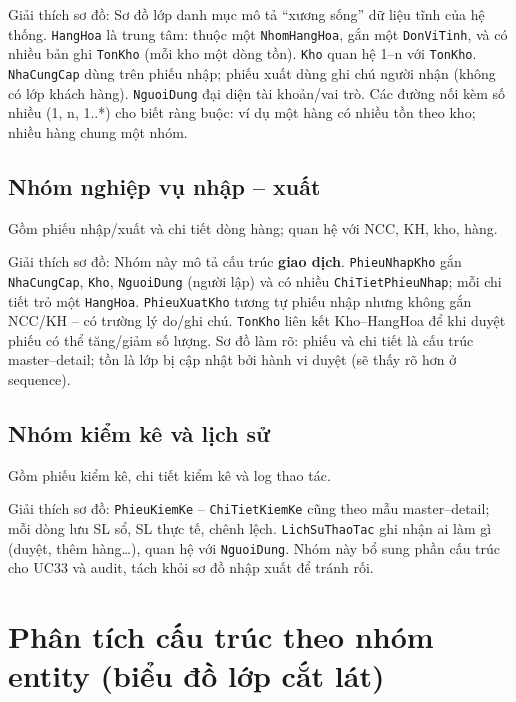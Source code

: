 Giải thích sơ đồ: Sơ đồ lớp danh mục mô tả ``xương sống'' dữ liệu tĩnh của hệ thống. \texttt{HangHoa} là trung tâm: thuộc một \texttt{NhomHangHoa}, gắn một \texttt{DonViTinh}, và có nhiều bản ghi \texttt{TonKho} (mỗi kho một dòng tồn). \texttt{Kho} quan hệ 1--n với \texttt{TonKho}. \texttt{NhaCungCap} dùng trên phiếu nhập; phiếu xuất dùng ghi chú người nhận (không có lớp khách hàng). \texttt{NguoiDung} đại diện tài khoản/vai trò. Các đường nối kèm số nhiều (1, n, 1..*) cho biết ràng buộc: ví dụ một hàng có nhiều tồn theo kho; nhiều hàng chung một nhóm.

\subsection{Nhóm nghiệp vụ nhập -- xuất}

Gồm phiếu nhập/xuất và chi tiết dòng hàng; quan hệ với NCC, KH, kho, hàng.



Giải thích sơ đồ: Nhóm này mô tả cấu trúc \textbf{giao dịch}. \texttt{PhieuNhapKho} gắn \texttt{NhaCungCap}, \texttt{Kho}, \texttt{NguoiDung} (người lập) và có nhiều \texttt{ChiTietPhieuNhap}; mỗi chi tiết trỏ một \texttt{HangHoa}. \texttt{PhieuXuatKho} tương tự phiếu nhập nhưng không gắn NCC/KH -- có trường lý do/ghi chú. \texttt{TonKho} liên kết Kho--HangHoa để khi duyệt phiếu có thể tăng/giảm số lượng. Sơ đồ làm rõ: phiếu và chi tiết là cấu trúc master--detail; tồn là lớp bị cập nhật bởi hành vi duyệt (sẽ thấy rõ hơn ở sequence).

\subsection{Nhóm kiểm kê và lịch sử}

Gồm phiếu kiểm kê, chi tiết kiểm kê và log thao tác.



Giải thích sơ đồ: \texttt{PhieuKiemKe} -- \texttt{ChiTietKiemKe} cũng theo mẫu master--detail; mỗi dòng lưu SL sổ, SL thực tế, chênh lệch. \texttt{LichSuThaoTac} ghi nhận ai làm gì (duyệt, thêm hàng\ldots), quan hệ với \texttt{NguoiDung}. Nhóm này bổ sung phần cấu trúc cho UC33 và audit, tách khỏi sơ đồ nhập xuất để tránh rối.

\section{Phân tích cấu trúc theo nhóm entity (biểu đồ lớp cắt lát)}

